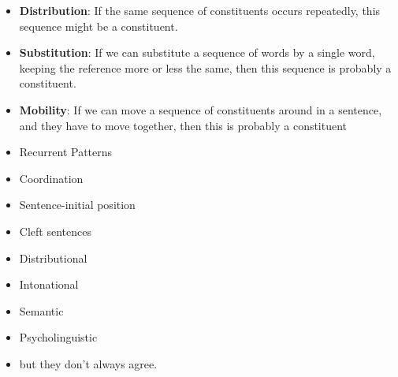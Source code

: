 \documentclass[a4paper,landscape,headrule,footrule]{foils}
\begin{document}
  \begin{itemize}
  \item
    \textbf{Distribution}: If the same sequence of constituents occurs repeatedly, this sequence might be a constituent.  
  \item
    \textbf{Substitution}: If we can substitute a sequence of words by a single word, keeping the reference more or less the same, then this sequence is probably a constituent.
  \item
    \textbf{Mobility}: If we can move a sequence of constituents around in a sentence, and they have to move together, then this is probably a constituent
  \end{itemize}



\begin{itemize}\addtolength{\itemsep}{-1ex}
\item Recurrent Patterns
\begin{exe}
\ex {}
\end{exe}

\item Coordination
\begin{exe}
\ex  {}
\end{exe}
\item Sentence-initial position
\begin{exe}
\ex {}
\end{exe}
\item Cleft sentences
\begin{exe}
\ex {}
\end{exe}
\end{itemize}

\begin{itemize}
\item Distributional
\item Intonational
\item Semantic
\item Psycholinguistic
\item[\ldots] but they don’t always agree.
\end{itemize}
\end{document}
